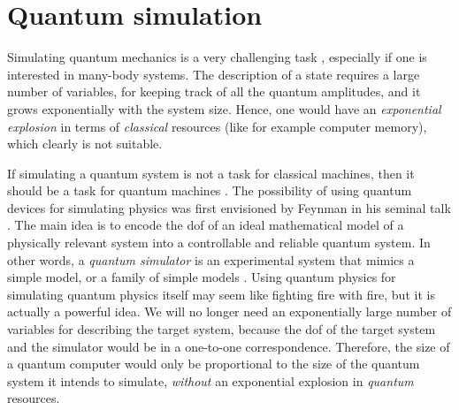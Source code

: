 \section{Quantum simulation}
\label{sec:quantum_simulation}

Simulating quantum mechanics is a very challenging task \cite{manin1980computable, feynman1982simulation}, especially if one is interested in many-body systems.
The description of a state requires a large number of variables, for keeping track of all the quantum amplitudes, and it grows exponentially with the system size.
Hence, one would have an \emph{exponential explosion} in terms of \emph{classical} resources (like for example computer memory), which clearly is not suitable.

If simulating a quantum system is not a task for classical machines, then it should be a task for quantum machines \cite{feynman1982simulation, georgescu2014simulation, hauke2012simulators, kendon2010quantum, buluta2009simulators}.
The possibility of using quantum devices for simulating physics was first envisioned by Feynman in his seminal talk \cite{feynman1982simulation}.
The main idea is to encode the \ac{dof} of an ideal mathematical model of a physically relevant system into a controllable and reliable quantum system.
In other words, a \emph{quantum simulator} is an experimental system that mimics a simple model, or a family of simple models \cite{hauke2012simulators}.
Using quantum physics for simulating quantum physics itself may seem like fighting fire with fire, but it is actually a powerful idea.
We will no longer need an exponentially large number of variables for describing the target system, because the \ac{dof} of the target system and the simulator would be in a one-to-one correspondence.
Therefore, the size of a quantum computer would only be proportional to the size of the quantum system it intends to simulate, \emph{without} an exponential explosion in \emph{quantum} resources.

